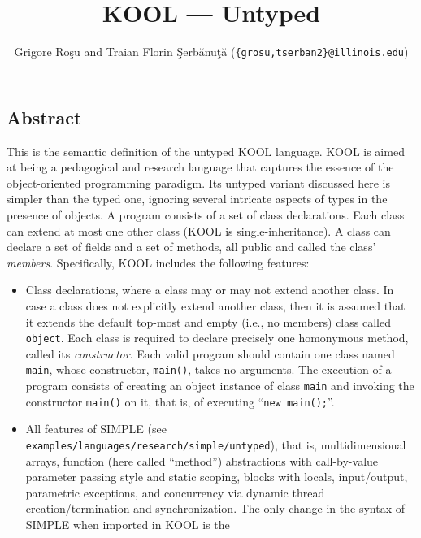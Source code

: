 \setlength{\parindent}{1em}
\title{KOOL --- Untyped}
\author{Grigore Ro\c{s}u and 
        Traian Florin \c{S}erb\u{a}nu\c{t}\u{a}
        (\texttt{\{grosu,tserban2\}@illinois.edu})}

\maketitle

\begin{kblock}[text]
\section{Abstract}
This is the \K semantic definition of the untyped KOOL language.
KOOL is aimed at being a pedagogical and research language that
captures the essence of the object-oriented programming paradigm.
Its untyped variant discussed here is simpler than the typed one,
ignoring several intricate aspects of types in the
presence of objects.  A program consists of a set of class declarations.
Each class can extend at most one other class (KOOL is single-inheritance).
A class can declare a set of fields and a set of methods, all public and
called the class' \textit{members}.
Specifically, KOOL includes the following features:
\begin{itemize}
\item Class declarations, where a class may or may not extend another class.
In case a class does not explicitly extend another class, then it is assumed
that it extends the default top-most and empty (i.e., no members)
class called \texttt{object}.  Each class is required to declare precisely one
homonymous method, called its \textit{constructor}.  Each valid
program should contain one class named \texttt{main}, whose
constructor, \texttt{main()}, takes no arguments.  The execution of a
program consists of creating an object instance of class \texttt{main}
and invoking the constructor \texttt{main()} on it, that is, of
executing ``\texttt{new main();}''.
\item All features of SIMPLE (see
{\footnotesize\texttt{examples/languages/research/simple/untyped}}),
that is, multidimensional arrays, function (here called ``method'')
abstractions with call-by-value parameter passing style and static
scoping, blocks with locals, input/output, parametric exceptions, and
concurrency via dynamic thread creation/termination and synchronization.  
The only change in the syntax of SIMPLE when imported in KOOL is the

\end{itemize}
\end{kblock}
